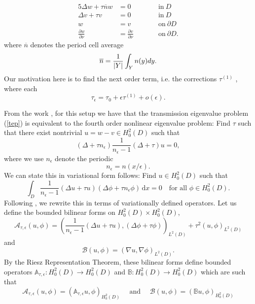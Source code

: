 \documentclass[10pt,a4paper]{amsart}
\begin{document}
\begin{alignat}{5}\label{tep0}
\Delta w+\tau \overline{n} w &= 0 &\qquad & \mathrm{in} \ D \\
\Delta v+\tau v& =0 & &  \mathrm{in}\  D \\
w&= v  & &\mathrm{on} \ \partial D \\
\displaystyle \frac{\partial w}{\partial \nu}&=\displaystyle \frac{\partial v}{\partial \nu} & & \mathrm{on}\  \partial D.\label{tep10} 
\end{alignat}
where  $\overline{n}$ denotes the period cell average 
$$ \overline{n} = {1\over{|Y|}} \int_Y n(y) dy .$$
Our motivation here is to find the next order term, i.e. the corrections $\tau^{(1)}$ , where each $$ \tau_\epsilon = \tau_0 +\epsilon \tau^{(1)} + o(\epsilon).$$ 

\noindent
From the work \cite{CaGiHa}, for this setup we have that the transmission eigenvalue problem (\ref{tep}) is equivalent to the fourth order nonlinear eigenvalue problem: Find $\tau$ such that there exist  nontrivial  $u=w-v\in H^2_0(D)$  such that 
\begin{equation}\label{10}
(\Delta +  \tau n_\epsilon) \frac{1}{n_\epsilon -1}(\Delta + \tau) u = 0,
\end{equation}
where we use $n_\epsilon$ denote the periodic $$n_\epsilon = n(x/\epsilon).$$
We can state this in variational form follows: Find $u\in H^2_0(D)$ such that
\begin{equation}\label{var}
\int_D \frac{1}{n_\epsilon -1}(\Delta u + \tau u)(\Delta \phi +\tau  n_\epsilon \phi )\, \mathrm{d}x = 0 \quad \text{for all $\phi\in H^2_0(D)$.}
\end{equation}
Following \cite{CaGiHa}, we rewrite this in terms of variationally defined operators. Let  us  define the bounded bilinear forms on $H^2_0(D)\times H^2_0(D)$,
\begin{equation} \label{AA}
\mathcal{A}_{\tau,\epsilon}(u,\phi)= \left ( 
\frac{1}{n_\epsilon-1}(\Delta u + \tau u), (\Delta \phi + \tau \phi)
\right )_{L^2(D)} + \tau^2 (u,\phi)_{L^2(D)}
\end{equation} and 
\begin{equation}
\mathcal{B}(u,\phi) = (\nabla u, \nabla \phi)_{L^2(D)}.
\end{equation}
By the Riesz Representation Theorem, these bilinear forms define bounded operators $\mathbb{A}_{\tau,\epsilon}: H^2_0(D)\rightarrow H^2_0(D)$ and $\mathbb{B}: H^2_0(D)\rightarrow H^2_0(D) $ which are such that 
\begin{equation}\label{Adef}
\mathcal{A}_{\tau,\epsilon}(u,\phi)=(\mathbb{A}_{\tau,\epsilon}u,\phi)_{H^2_0(D)}\quad
 \text{ and }\quad 
\mathcal{B}(u,\phi)=(\mathbb{B} u,\phi)_{H^2_0(D)}
\end{equation}
\end{document}
